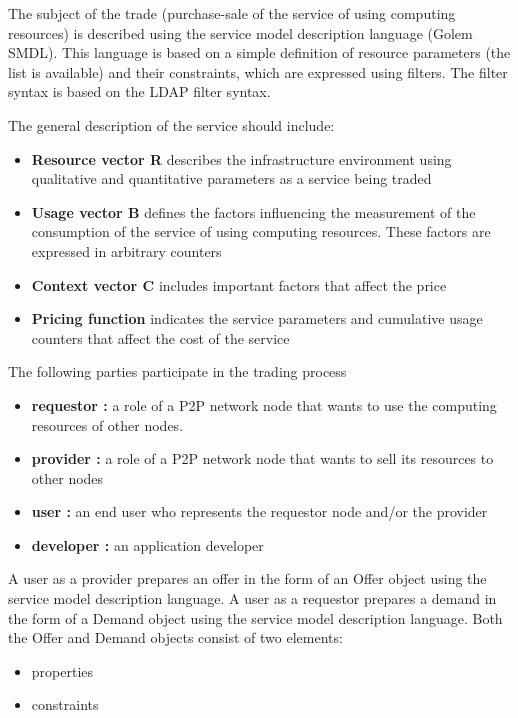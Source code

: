 \newpage

The subject of the trade (purchase-sale of the service of using computing resources)
is described using the service model description language (Golem SMDL).
This language is based on a simple definition of resource parameters (the list is available) and their constraints, which are expressed using filters.
The filter syntax is based on the LDAP filter syntax.

The general description of the service should include:

\begin{itemize}
\item {\bf Resource vector R} describes the infrastructure environment using qualitative and quantitative parameters as a service being traded
\item {\bf Usage vector B} defines the factors influencing the measurement of the consumption of the service of using computing resources. These factors are expressed in arbitrary counters
\item {\bf Context vector C} includes important factors that affect the price
\item {\bf Pricing function} indicates the service parameters and cumulative usage counters that affect the cost of the service
\end{itemize}

The following parties participate in the trading process

\begin{itemize}
\item {\bf requestor :} a role of a P2P network node that wants to use the computing resources of other nodes.
\item {\bf provider :} a role of a P2P network node that wants to sell its resources to other nodes
\item {\bf user :} an end user who represents the requestor node and/or the provider
\item {\bf developer :} an application developer
\end{itemize}

A user as a provider prepares an offer in the form of an Offer object using the service model description language.
A user as a requestor prepares a demand in the form of a Demand object using the service model description language.
Both the Offer and Demand objects consist of two elements:

\begin{itemize}
\item properties
\item constraints
\end{itemize}

